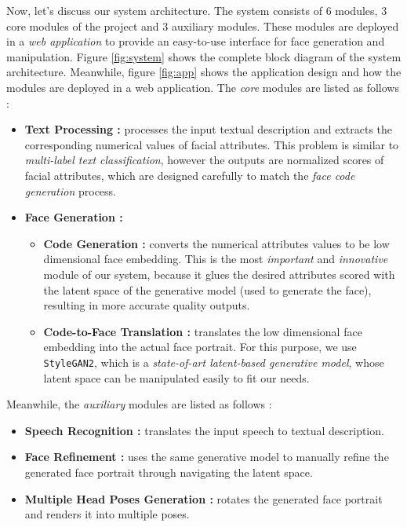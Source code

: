 Now, let's discuss our system architecture. The system consists of $6$ modules, $3$ core modules of the project and $3$ auxiliary modules. These modules are deployed in a \emph{web application} to provide an easy-to-use interface for face generation and manipulation. Figure \ref{fig:system} shows the complete block diagram of the system architecture. Meanwhile, figure \ref{fig:app} shows the application design and how the modules are deployed in a web application. The \emph{core} modules are listed as follows :
\begin{itemize}
    \item \textbf{Text Processing :} processes the input textual description and extracts the corresponding numerical values of facial attributes. This problem is similar to \emph{multi-label text classification}, however the outputs are normalized scores of facial attributes, which are designed carefully to match the \emph{face code generation} process.
    \item \textbf{Face Generation :}
    \begin{itemize}
        \item \textbf{Code Generation :} converts the numerical attributes values to be low dimensional face embedding. This is the most \emph{important} and \emph{innovative} module of our system, because it glues the desired attributes scored with the latent space of the generative model (used to generate the face), resulting in more accurate quality outputs.
        \item \textbf{Code-to-Face Translation :} translates the low dimensional face embedding into the actual face portrait. For this purpose, we use \texttt{StyleGAN2}, which is a \emph{state-of-art latent-based generative model}, whose latent space can be manipulated easily to fit our needs.
    \end{itemize}
\end{itemize}

Meanwhile, the \emph{auxiliary} modules are listed as follows :
\begin{itemize}
    \item \textbf{Speech Recognition :} translates the input speech to textual description.
    \item \textbf{Face Refinement :} uses the same generative model to manually refine the generated face portrait through navigating the latent space.
    \item \textbf{Multiple Head Poses Generation :} rotates the generated face portrait and renders it into multiple poses.
\end{itemize}

